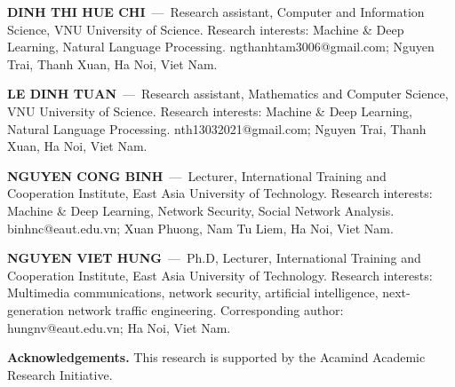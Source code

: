 \documentclass[10pt]{SPIIRAS_Proceedings}
\begin{document}



\begin{aboutAuthors}
    \textbf{DINH THI HUE CHI}~---~Research assistant, Computer and Information Science, VNU University of Science. Research interests: Machine \& Deep Learning, Natural Language Processing. ngthanhtam3006@gmail.com; Nguyen Trai, Thanh Xuan, Ha Noi, Viet Nam.\smallskip
    
    \textbf{LE DINH TUAN}~---~Research assistant, Mathematics and Computer Science, VNU University of Science. Research interests: Machine \& Deep Learning, Natural Language Processing. nth13032021@gmail.com; Nguyen Trai, Thanh Xuan, Ha Noi, Viet Nam.\smallskip

    \textbf{NGUYEN CONG BINH}~---~Lecturer, International Training and Cooperation Institute, East Asia University of Technology. Research interests: Machine \& Deep Learning, Network Security, Social Network Analysis. binhnc@eaut.edu.vn; Xuan Phuong, Nam Tu Liem, Ha Noi, Viet Nam.\smallskip

    \textbf{NGUYEN VIET HUNG}~---~Ph.D, Lecturer, International Training and Cooperation Institute, East Asia University of Technology. Research interests: Multimedia communications, network security, artificial intelligence, next-generation network traffic engineering. Corresponding author: hungnv@eaut.edu.vn; Ha Noi, Viet Nam.\smallskip

    \textbf{Acknowledgements.} This research is supported by the Acamind Academic Research Initiative.
\end{aboutAuthors}
\end{document}
